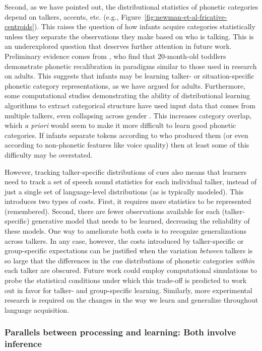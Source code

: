 Second, as we have pointed out, the distributional statistics of phonetic categories depend on talkers, accents, etc. (e.g., Figure~\ref{fig:newman-et-al-fricative-centroids}). This raises the question of how infants acquire categories statistically unless they
separate the observations they make based on who is talking. This is an underexplored question that deserves further attention in future work. Preliminary evidence comes from \textcite{White2011}, who find that 20-month-old toddlers demonstrate phonetic recalibration in paradigms similar to those used in research on adults. This suggests that infants may be learning talker- or situation-specific phonetic category representations, as we have argued for adults.  Furthermore, some computational studies demonstrating the ability of distributional learning algorithms to extract categorical structure have used input data that comes from multiple talkers, even collapsing across gender \autocite[e.g.,][]{Feldman2013a}. This increases category overlap, which \emph{a priori} would seem to make it more difficult to learn good phonetic categories.  If infants separate tokens according to who produced them (or even according to non-phonetic features like voice quality) then at least some of this difficulty may be overstated.  

\label{r1-acquisition}
However, tracking talker-specific distributions of cues also means that learners need to track a set of speech sound statistics for each individual talker, instead of just a single set of language-level distributions (as is typically modeled).  This introduces two types of costs.  First, it requires more statistics to be represented (remembered).  Second, there are fewer observations available for each (talker-specific) generative model that needs to be learned, decreasing the reliability of these models.  One way to ameliorate both costs is to recognize generalizations across talkers. In any case, however, the costs introduced by talker-specific or group-specific expectations can be justified when the variation \emph{between} talkers is so large that the differences in the cue distributions of phonetic categories \emph{within} each talker are obscured.  Future work could employ computational simulations to probe the statistical conditions under which this trade-off is predicted to work out in favor for talker- and group-specific learning. Similarly, more experimental research is required on the changes in the way we learn and generalize throughout language acquisition.

\subsubsection{Parallels between processing and learning: Both involve inference}
\label{sec:pull-togeth-proc}

